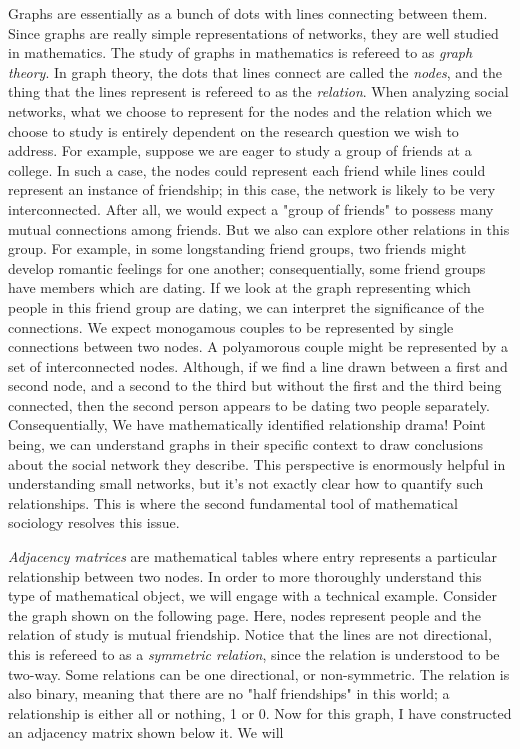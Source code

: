 \documentclass{article}
\begin{document}
    \hspace{20pt} Graphs are essentially as a bunch of dots with lines connecting between them. Since graphs are really simple representations of networks, they are well studied in mathematics. The study of graphs in mathematics is refereed to as {\em \large graph theory}. In graph theory, the dots that lines connect are called the {\em \large nodes}, and the thing that the lines represent is refereed to as the {\em \large relation}. When analyzing social networks, what we choose to represent for the nodes and the relation which we choose to study is entirely dependent on the research question we wish to address. For example, suppose we are eager to study a group of friends at a college. In such a case, the nodes could represent each friend while lines could represent an instance of friendship; in this case, the network is likely to be very interconnected. After all, we would expect a "group of friends" to possess many mutual connections among friends. But we also can explore other relations in this group. For example, in some longstanding friend groups, two friends might develop romantic feelings for one another; consequentially, some friend groups have members which are dating. If we look at the graph representing which people in this friend group are dating, we can interpret the significance of the connections. We expect monogamous couples to be represented by single connections between two nodes. A polyamorous couple might be represented by a set of interconnected nodes. Although, if we find a line drawn between a first and second node, and a second to the third but without the first and the third being connected, then the second person appears to be dating two people separately. Consequentially, We have mathematically identified relationship drama! Point being, we can understand graphs in their specific context to draw conclusions about the social network they describe. This perspective is enormously helpful in understanding small networks, but it's not exactly clear how to quantify such relationships. This is where the second fundamental tool of mathematical sociology resolves this issue.
    
    \hspace{20pt} {\em \large Adjacency matrices} are mathematical tables where entry represents a particular relationship between two nodes. In order to more thoroughly understand this type of mathematical object, we will engage with a technical example. Consider the graph shown on the following page. Here, nodes represent people and the relation of study is mutual friendship. Notice that the lines are not directional, this is refereed to as a {\em \large symmetric relation}, since the relation is understood to be two-way. Some relations can be one directional, or non-symmetric. The relation is also binary,  meaning that there are no "half friendships" in this world; a relationship is either all or nothing, 1 or 0. Now for this graph, I have constructed an adjacency matrix shown below it.  We will
    
\end{document}
